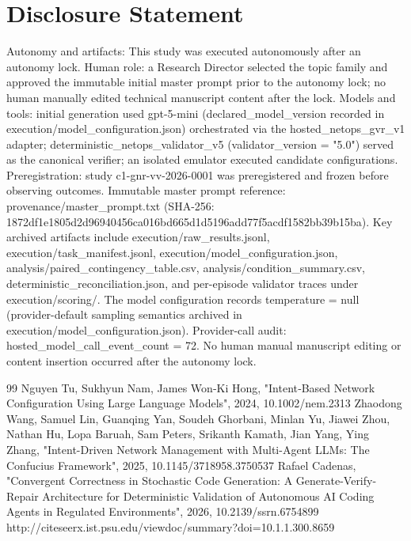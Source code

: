 \documentclass[conference]{IEEEtran}
\begin{document}
\section*{Disclosure Statement}
Autonomy and artifacts: This study was executed autonomously after an autonomy lock. Human role: a Research Director selected the topic family and approved the immutable initial master prompt prior to the autonomy lock; no human manually edited technical manuscript content after the lock. Models and tools: initial generation used gpt-5-mini (declared\_model\_version recorded in execution/model\_configuration.json) orchestrated via the hosted\_netops\_gvr\_v1 adapter; deterministic\_netops\_validator\_v5 (validator\_version = "5.0") served as the canonical verifier; an isolated emulator executed candidate configurations. Preregistration: study c1-gnr-vv-2026-0001 was preregistered and frozen before observing outcomes. Immutable master prompt reference: provenance/master\_prompt.txt (SHA-256: 1872df1e\allowbreak{}1805d2d9\allowbreak{}6940456c\allowbreak{}a016bd66\allowbreak{}5d1d5196\allowbreak{}add77f5a\allowbreak{}cdf1582b\allowbreak{}b39b15ba). Key archived artifacts include execution/raw\_results.jsonl, execution/task\_manifest.jsonl, execution/model\_configuration.json, analysis/paired\_contingency\_table.csv, analysis/condition\_summary.csv, deterministic\_reconciliation.json, and per-episode validator traces under execution/scoring/. The model configuration records temperature = null (provider-default sampling semantics archived in execution/model\_configuration.json). Provider-call audit: hosted\_model\_call\_event\_count = 72. No human manual manuscript editing or content insertion occurred after the autonomy lock.

\begin{thebibliography}{99}
 Nguyen Tu, Sukhyun Nam, James Won‐Ki Hong, "Intent‐Based Network Configuration Using Large Language Models", 2024, 10.1002/nem.2313
 Zhaodong Wang, Samuel Lin, Guanqing Yan, Soudeh Ghorbani, Minlan Yu, Jiawei Zhou, Nathan Hu, Lopa Baruah, Sam Peters, Srikanth Kamath, Jian Yang, Ying Zhang, "Intent-Driven Network Management with Multi-Agent LLMs: The Confucius Framework", 2025, 10.1145/3718958.3750537
 Rafael Cadenas, "Convergent Correctness in Stochastic Code Generation: A Generate-Verify-Repair Architecture for Deterministic Validation of Autonomous AI Coding Agents in Regulated Environments", 2026, 10.2139/ssrn.6754899
 http://citeseerx.ist.psu.edu/viewdoc/summary?doi=10.1.1.300.8659
\end{thebibliography}
\end{document}

